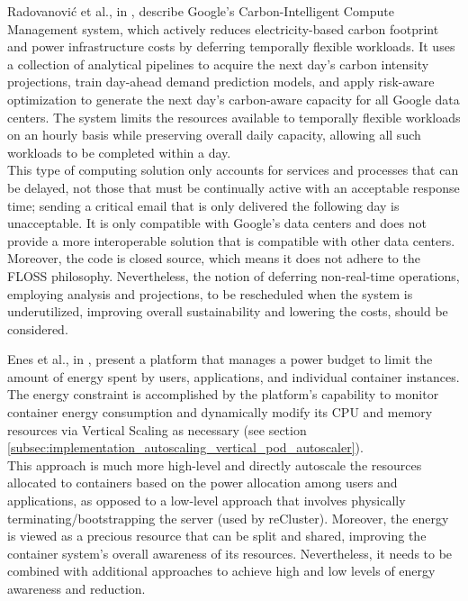 Radovanovi\'{c} et al., in \cite{carbon_aware_computing_datacenters}, describe
Google's Carbon-Intelligent Compute Management system, which actively reduces electricity-based
carbon footprint and power infrastructure costs by deferring temporally flexible
workloads. It uses a collection of analytical pipelines to acquire the next day's
carbon intensity projections, train day-ahead demand prediction models, and
apply risk-aware optimization to generate the next day's carbon-aware capacity
for all Google data centers. The system limits the resources available to temporally
flexible workloads on an hourly basis while preserving overall daily capacity,
allowing all such workloads to be completed within a day. \\ %
This type of computing solution only accounts for services and processes that
can be delayed, not those that must be continually active with an acceptable response
time; sending a critical email that is only delivered the following day is
unacceptable. It is only compatible with Google's data centers and does not provide
a more interoperable solution that is compatible with other data centers.
Moreover, the code is closed source, which means it does not adhere to the FLOSS
philosophy. Nevertheless, the notion of deferring non-real-time operations, employing
analysis and projections, to be rescheduled when the system is underutilized, improving
overall sustainability and lowering the costs, should be considered.

Enes et al., in \cite{power_budgeting_big_data_applications}, present a platform
that manages a power budget to limit the amount of energy spent by users,
applications, and individual container instances. The energy constraint is
accomplished by the platform's capability to monitor container energy
consumption and dynamically modify its CPU and memory resources via Vertical
Scaling as necessary (see section \ref{subsec:implementation_autoscaling_vertical_pod_autoscaler}).
\\ %
This approach is much more high-level and directly autoscale the resources
allocated to containers based on the power allocation among users and
applications, as opposed to a low-level approach that involves physically terminating/bootstrapping
the server (used by reCluster). Moreover, the energy is viewed as a precious resource
that can be split and shared, improving the container system's overall awareness
of its resources. Nevertheless, it needs to be combined with additional
approaches to achieve high and low levels of energy awareness and reduction.

